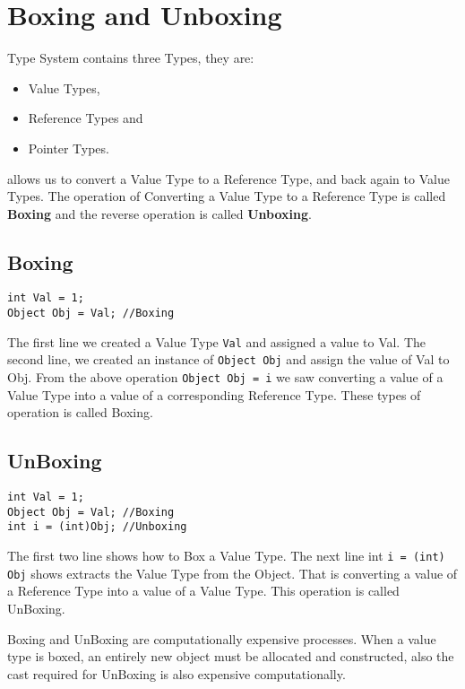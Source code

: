 \section{Boxing and Unboxing}

{\cs} Type System contains three Types, they are:
\begin{itemize}
	\item Value Types,
	\item Reference Types and
	\item Pointer Types.
\end{itemize}
{\cs} allows us to convert a Value Type to a Reference Type, and back again to Value Types. The operation of Converting a Value Type to a Reference Type is called \textbf{Boxing} and the reverse operation is called \textbf{Unboxing}.

\subsection{Boxing}
\begin{lstlisting}
int Val = 1;
Object Obj = Val; //Boxing
\end{lstlisting}

The first line we created a Value Type \texttt{Val} and assigned a value to Val. The second line, we created an instance of \texttt{Object Obj} and assign the value of Val to Obj. From the above operation \verb|Object Obj = i| we saw converting a value of a Value Type into a value of a corresponding Reference Type. These types of operation is called Boxing.

\subsection{UnBoxing}
\begin{lstlisting}
int Val = 1;
Object Obj = Val; //Boxing
int i = (int)Obj; //Unboxing
\end{lstlisting}

The first two line shows how to Box a Value Type. The next line int \texttt{i = (int) Obj} shows extracts the Value Type from the Object. That is converting a value of a Reference Type into a value of a Value Type. This operation is called UnBoxing.

Boxing and UnBoxing are computationally expensive processes. When a value type is boxed, an entirely new object must be allocated and constructed, also the cast required for UnBoxing is also expensive computationally.

